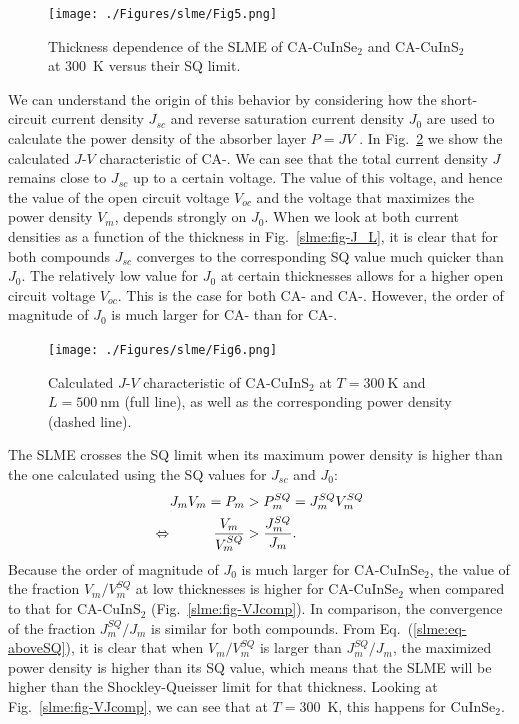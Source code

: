 \begin{refsection}
\begin{figure}[htbp] 
	\centering 
		\texttt{[image: ./Figures/slme/Fig5.png]} 
	\caption{Thickness dependence of the SLME of CA-CuInSe$_2$ and CA-CuInS$_2$ 
at 300~\si{\kelvin} versus their SQ limit.} 
	\label{slme:fig-SLME_L} 
\end{figure} 
 
We can understand the origin of this behavior by considering how the 
short-circuit current density $J_{sc}$ and reverse saturation current density 
$J_0$ are used to calculate the power density of the absorber layer $P = JV$ . 
In Fig.~\ref{slme:fig-CuInS2_JV} we show the calculated \mbox{$J$-$V$} 
characteristic of \mbox{CA-}. We can see that the total current 
density $J$ remains close to $J_{sc}$ up to a certain voltage. The value of 
this voltage, and hence the value of the open circuit voltage $V_{oc}$ and the 
voltage that maximizes the power density $V_{m}$, depends strongly on $J_0$. 
When we look at both current densities as a function of the thickness in 
Fig.~\ref{slme:fig-J_L}, it is clear that for both compounds $J_{sc}$ 
converges to the corresponding SQ value much quicker than $J_0$. The 
relatively low value for $J_0$ at certain thicknesses allows for a higher open 
circuit voltage $V_{oc}$. This is the case for both \mbox{CA-} and 
\mbox{CA-}. However, the order of magnitude of $J_0$ is much 
larger for CA- than for \mbox{CA-}. 
 
\begin{figure}[htbp] 
	\centering 
		\texttt{[image: ./Figures/slme/Fig6.png]} 
	\caption{Calculated $J$-$V$ characteristic of CA-CuInS$_2$ at 
$T=300~\si{\kelvin}$ and $L = 500~\si{\nano\meter}$ (full line), as well as 
the corresponding power density (dashed line).} 
	\label{slme:fig-CuInS2_JV} 
\end{figure} 
 
The SLME crosses the SQ limit when its maximum power density is higher than 
the one calculated using the SQ values for $J_{sc}$ and $J_0$: 
\begin{equation} \label{slme:eq-aboveSQ} 
\begin{aligned} 
J_m V_m = P_m &> P_m^{SQ} = J_m^{SQ} V_m^{SQ} \\ 
\Leftrightarrow \hspace{0.4in}\frac{V_m}{V_m^{SQ}} &> \frac{J_m^{SQ}}{J_m}. 
\end{aligned} 
\end{equation} 
Because the order of magnitude of $J_0$ is much larger for 
\mbox{CA-CuInSe$_2$}, the value of the fraction $V_m/V_m^{SQ}$ at low 
thicknesses is higher for \mbox{CA-CuInSe$_2$} when compared to that for 
\mbox{CA-CuInS$_2$} (Fig.~\ref{slme:fig-VJcomp}). In comparison, the 
convergence of the fraction $J_m^{SQ}/J_m$ is similar for both compounds. From 
Eq.~(\ref{slme:eq-aboveSQ}), it is clear that when $V_m/V_m^{SQ}$ is larger 
than $J_m^{SQ}/J_m$, the maximized power density is higher than its SQ value, 
which means that the SLME will be higher than the Shockley-Queisser limit for 
that thickness. Looking at Fig.~\ref{slme:fig-VJcomp}, we can see that at 
$T=300$~\si{\kelvin}, this happens for CuInSe$_2$. 
 

\end{refsection}
